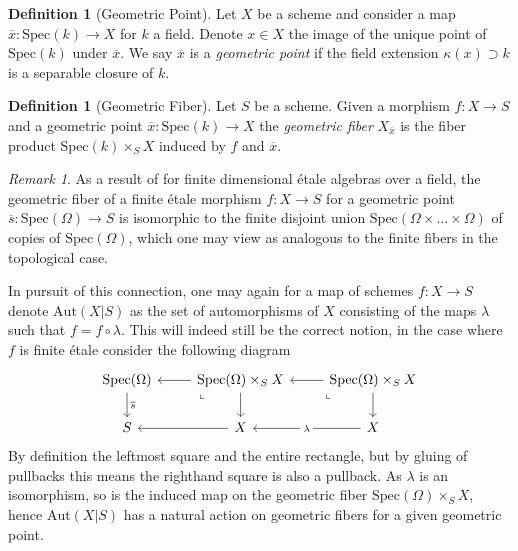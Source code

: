 \documentclass{article}
\theoremstyle{definition}
\newtheorem{definition}[theorem]{Definition}
\theoremstyle{remark}
\newtheorem*{remark}{Remark}
\theoremstyle{plain}
\begin{document}
\begin{definition}[Geometric Point]
	Let $X$ be a scheme and consider a map $\overline{x}: \text{Spec}(k) \to X$ for $k$ a field.
	Denote $x \in X$ the image of the unique point of $\text{Spec}(k)$ under $\overline{x}$.
	We say $\overline{x}$ is a \textit{geometric point} if the field extension $\kappa(x) \supset k$ is a separable closure of $k$.
\end{definition}

\begin{definition}[Geometric Fiber]
	Let $S$ be a scheme. 
	Given a morphism $f: X \to S$ and a geometric point $\overline{x}: \text{Spec}(k) \to X$ the \textit{geometric fiber} $X_{\overline{x}}$ is the fiber product $\text{Spec}(k) \times_S X$ induced by $f$ and $\overline{x}$.
\end{definition}

\begin{remark}
As a result of  for finite dimensional \'etale algebras over a field, the geometric fiber of a finite \'etale morphism $f: X \to S$ for a geometric point $\overline{s} : \text{Spec}(\Omega) \to S $ is isomorphic to the finite disjoint union $\text{Spec}(\Omega \times \dots \times \Omega)$ of copies of $\text{Spec}(\Omega)$, which one may view as analogous to the finite fibers in the topological case.
\end{remark}

In pursuit of this connection, one may again for a map of schemes $f: X \to S$ denote $\text{Aut}(X|S)$ as the set of automorphisms of $X$ consisting of the maps $\lambda$ such that $f  = f \circ \lambda$.
This will indeed still be the correct notion, in the case where $f$ is finite \'etale consider the following diagram
\[\begin{tikzcd}
	{\text{Spec}(\Omega)} & {\text{Spec}(\Omega)\times_S X} & {\text{Spec}(\Omega)\times_S X} \\
	S & X & X
	\arrow["{\overline{s}}", from=1-1, to=2-1]
	\arrow[from=1-2, to=1-1]
	\arrow["\lrcorner"{anchor=center, pos=0.125, rotate=-90}, draw=none, from=1-2, to=2-1]
	\arrow[from=1-2, to=2-2]
	\arrow[from=1-3, to=1-2]
	\arrow["\lrcorner"{anchor=center, pos=0.125, rotate=-90}, draw=none, from=1-3, to=2-2]
	\arrow[from=1-3, to=2-3]
	\arrow[from=2-2, to=2-1]
	\arrow["\lambda"{description}, from=2-3, to=2-2]
\end{tikzcd}\]
By definition the leftmost square and the entire rectangle, but by gluing of pullbacks this means the righthand square is also a pullback.
As $\lambda$ is an isomorphism, so is the induced map on the geometric fiber $\text{Spec}(\Omega)\times_S X$, hence $\text{Aut}(X|S)$ has a natural action on geometric fibers for a given geometric point.
\end{document}
